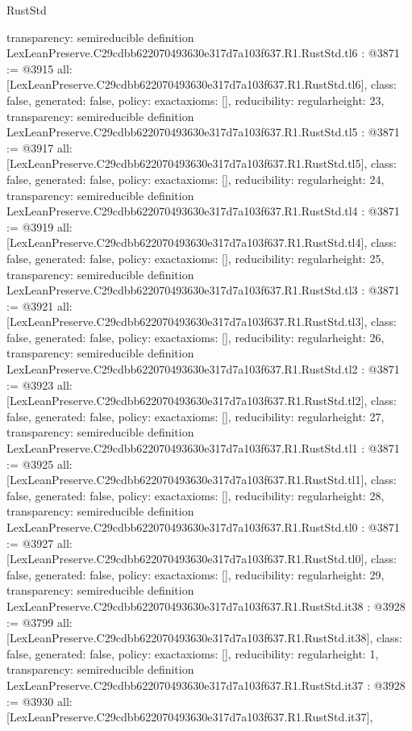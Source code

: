 \begin{lexlean}{RustStd}
\begin{coremodule}
{  transparency: semireducible
}
definition LexLeanPreserve.C29cdbb622070493630e317d7a103f637.R1.RustStd.tl6 : @3871 := @3915 {
  all: [LexLeanPreserve.C29cdbb622070493630e317d7a103f637.R1.RustStd.tl6],
  class: false,
  generated: false,
  policy: exact{axioms: []},
  reducibility: regular{height: 23},
  transparency: semireducible
}
definition LexLeanPreserve.C29cdbb622070493630e317d7a103f637.R1.RustStd.tl5 : @3871 := @3917 {
  all: [LexLeanPreserve.C29cdbb622070493630e317d7a103f637.R1.RustStd.tl5],
  class: false,
  generated: false,
  policy: exact{axioms: []},
  reducibility: regular{height: 24},
  transparency: semireducible
}
definition LexLeanPreserve.C29cdbb622070493630e317d7a103f637.R1.RustStd.tl4 : @3871 := @3919 {
  all: [LexLeanPreserve.C29cdbb622070493630e317d7a103f637.R1.RustStd.tl4],
  class: false,
  generated: false,
  policy: exact{axioms: []},
  reducibility: regular{height: 25},
  transparency: semireducible
}
definition LexLeanPreserve.C29cdbb622070493630e317d7a103f637.R1.RustStd.tl3 : @3871 := @3921 {
  all: [LexLeanPreserve.C29cdbb622070493630e317d7a103f637.R1.RustStd.tl3],
  class: false,
  generated: false,
  policy: exact{axioms: []},
  reducibility: regular{height: 26},
  transparency: semireducible
}
definition LexLeanPreserve.C29cdbb622070493630e317d7a103f637.R1.RustStd.tl2 : @3871 := @3923 {
  all: [LexLeanPreserve.C29cdbb622070493630e317d7a103f637.R1.RustStd.tl2],
  class: false,
  generated: false,
  policy: exact{axioms: []},
  reducibility: regular{height: 27},
  transparency: semireducible
}
definition LexLeanPreserve.C29cdbb622070493630e317d7a103f637.R1.RustStd.tl1 : @3871 := @3925 {
  all: [LexLeanPreserve.C29cdbb622070493630e317d7a103f637.R1.RustStd.tl1],
  class: false,
  generated: false,
  policy: exact{axioms: []},
  reducibility: regular{height: 28},
  transparency: semireducible
}
definition LexLeanPreserve.C29cdbb622070493630e317d7a103f637.R1.RustStd.tl0 : @3871 := @3927 {
  all: [LexLeanPreserve.C29cdbb622070493630e317d7a103f637.R1.RustStd.tl0],
  class: false,
  generated: false,
  policy: exact{axioms: []},
  reducibility: regular{height: 29},
  transparency: semireducible
}
definition LexLeanPreserve.C29cdbb622070493630e317d7a103f637.R1.RustStd.it38 : @3928 := @3799 {
  all: [LexLeanPreserve.C29cdbb622070493630e317d7a103f637.R1.RustStd.it38],
  class: false,
  generated: false,
  policy: exact{axioms: []},
  reducibility: regular{height: 1},
  transparency: semireducible
}
definition LexLeanPreserve.C29cdbb622070493630e317d7a103f637.R1.RustStd.it37 : @3928 := @3930 {
  all: [LexLeanPreserve.C29cdbb622070493630e317d7a103f637.R1.RustStd.it37],
}
\end{coremodule}
\end{lexlean}

